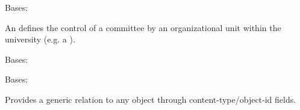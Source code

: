 \documentclass[letterpaper,10pt,english]{sphinxmanual}
\begin{document}
\begin{fulllineitems}
\label{generated/apps.reporting.models:apps.reporting.models.Authority}
Bases: 

An  defines the control of a committee by an organizational
unit within the university (e.g. a ).


\begin{fulllineitems}
\label{generated/apps.reporting.models:apps.reporting.models.Authority.DoesNotExist}
Bases: 

\end{fulllineitems}



\begin{fulllineitems}
\label{generated/apps.reporting.models:apps.reporting.models.Authority.MultipleObjectsReturned}
Bases: 

\end{fulllineitems}



\begin{fulllineitems}
\label{generated/apps.reporting.models:apps.reporting.models.Authority.committee}
\end{fulllineitems}



\begin{fulllineitems}
\label{generated/apps.reporting.models:apps.reporting.models.Authority.content_object}
Provides a generic relation to any object through content-type/object-id
fields.

\end{fulllineitems}




\end{fulllineitems}
\end{document}
